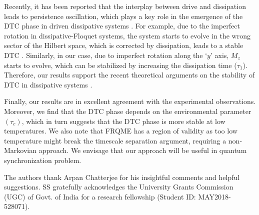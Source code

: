 \documentclass[prl,aps,twocolumn,floatfix]{revtex4-1}
\begin{document}
Recently, 
it has been reported that the interplay between
drive and dissipation leads to persistence oscillation, which plays a key role in the emergence of the DTC
phase in driven dissipative systems \cite{gambetta_discrete_2019,lazarides_time_2020,
buca_non-stationary_2019, passarelli_dissipative_2022,sarkar_signatures_2022}. For example, due to the
imperfect rotation in dissipative-Floquet systems, the system starts to evolve in the wrong sector of the
Hilbert space, which is corrected by dissipation, leads to a stable DTC \cite{lazarides_time_2020}.
Similarly, in our case,  due to imperfect rotation along the `$y$' axis, $M_z$ starts to evolve, which can
be stabilized by increasing the dissipation time ($\tau_1$). Therefore, our results support the recent
theoretical arguments on the stability of DTC in dissipative systems \cite{lazarides_time_2020}.

Finally, our results are in excellent agreement with the experimental observations. 
Moreover, we find that the DTC phase depends on the environmental parameter $(\tau_c)$, which in turn suggests 
that the DTC phase is more stable at low temperatures. We also note that FRQME has a region of validity as
too low temperature might break the timescale separation argument, requiring a non-Markovian approach. We
envisage that our approach will be useful in quantum synchronization problem.


\begin{acknowledgments}
The authors thank Arpan Chatterjee for his insightful comments and helpful suggestions. SS gratefully
acknowledges the University Grants Commission (UGC) of Govt. of India for a research fellowship (Student ID:
MAY2018- 528071).
\end{acknowledgments}



\end{document}
